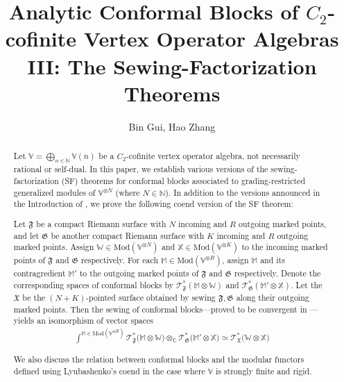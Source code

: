 \documentclass[11pt,b5paper,notitlepage]{article}
\title{Analytic Conformal Blocks of $C_2$-cofinite Vertex Operator Algebras III: The Sewing-Factorization Theorems}
\author{{\sc Bin Gui, Hao Zhang}
}
\date{}
\theoremstyle{definition}
\theoremstyle{plain}
\newcommand{\Vbb}{\mathbb V}
\newcommand{\Xbb}{\mathbb X}
\newcommand{\Wbb}{\mathbb W}
\newcommand{\Mbb}{\mathbb M}
\newcommand{\Cbb}{\mathbb C}
\newcommand{\Nbb}{\mathbb N}
\newcommand{\<}{\left\langle}
\renewcommand{\>}{\right\rangle}
\newcommand{\fx}{\mathfrak{X}}
\newcommand{\ST}{\mathscr{T}}
\newcommand{\Mod}{\mathrm{Mod}}
\newcommand{\ff}{\mathfrak{F}}
\newcommand{\fg}{\mathfrak{G}}
\numberwithin{equation}{section}
\begin{document}
\sloppy %
	\setcounter{section}{-1}
	
	
	
	\maketitle
	
	
\newcommand\blfootnote[1]{%
	\begingroup
	\renewcommand\thefootnote{}\footnote{#1}%
	\addtocounter{footnote}{-1}%
	\endgroup
}



\begin{abstract}
Let $\Vbb=\bigoplus_{n\in\Nbb}\Vbb(n)$ be a $C_2$-cofinite vertex operator algebra, not necessarily rational or self-dual. In this paper, we establish various versions of the sewing-factorization (SF) theorems for conformal blocks associated to grading-restricted generalized modules of $\Vbb^{\otimes N}$ (where $N\in\Nbb$). In addition to the versions announced in the Introduction of \cite{GZ1}, we prove the following coend version of the SF theorem:

Let $\ff$ be a compact Riemann surface with $N$ incoming and $R$ outgoing marked points, and let $\fg$ be another compact Riemann surface with $K$ incoming and $R$ outgoing marked points. Assign $\Wbb\in\Mod(\Vbb^{\otimes N})$ and $\Xbb\in\Mod(\Vbb^{\otimes K})$ to the incoming marked points of $\ff$ and $\fg$ respectively. For each $\Mbb\in\Mod(\Vbb^{\otimes R})$, assign $\Mbb$ and its contragredient $\Mbb'$ to the outgoing marked points of $\ff$ and $\fg$ respectively. Denote the corresponding spaces of conformal blocks by $\ST^*_\ff(\Mbb\otimes\Wbb)$ and $\ST^*_\fg(\Mbb'\otimes\Xbb)$. Let the $\fx$ be the $(N+K)$-pointed surface obtained by sewing $\ff,\fg$ along their outgoing marked points. Then the sewing of conformal blocks---proved to be convergent in \cite{GZ2}---yields an isomorphism of vector spaces
\begin{align*}
\int^{\Mbb\in\Mod(\Vbb^{\otimes R})}\ST^*_\ff\big(\Mbb\otimes\Wbb\big)\otimes_\Cbb\ST^*_\fg\big(\Mbb'\otimes\Xbb\big)\simeq\ST_\fx^*\big(\Wbb\otimes \Xbb\big)
\end{align*}

We also discuss the relation between conformal blocks and the modular functors defined using Lyubashenko's coend in the case where $\Vbb$ is strongly finite and rigid. 
\end{abstract}
\end{document}
